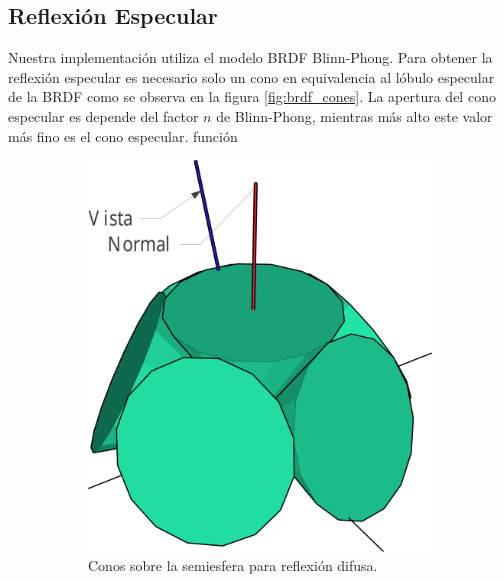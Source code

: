 \subsection{Reflexión Especular}
Nuestra implementación utiliza el modelo \ac{BRDF} Blinn-Phong. Para obtener la reflexión especular es necesario solo un cono en equivalencia al lóbulo especular de la \ac{BRDF} como se observa en la figura \ref{fig:brdf_cones}. La apertura del cono especular es depende del factor $n$ de Blinn-Phong, mientras más alto este valor más fino es el cono especular.
función
\begin{figure}[H]
	\centering
	\begin{subfigure}[t]{.32\linewidth}
		\centering
		\captionsetup{justification=centering}
		\includegraphics[width=\linewidth]{media/diffuse_cones_cropped.pdf}
		\caption*{Conos sobre la semiesfera para reflexión difusa.}
	\end{subfigure}%
	\hspace{0.01\textwidth}
	\begin{subfigure}[t]{.32\linewidth}
		\centering
		\captionsetup{justification=centering}

\end{subfigure}
\end{figure}
